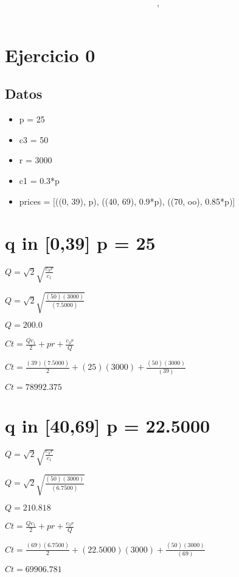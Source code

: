 \documentclass{article}
\author{\nombre , \carnet}
\title{\textbf{\Huge\titulo}}
\newcommand*\rbreak{\par\noindent\linebreak}
\begin{document}
%

\maketitle


\section{\Huge Ejercicio 0}
\subsection{\Huge Datos}
\begin{huge}
\begin{itemize}
\item p = 25
\item c3 = 50
\item r = 3000
\item c1 = 0.3*p
\item prices = [((0, 39), p), ((40, 69), 0.9*p), ((70, oo), 0.85*p)]
\end{itemize}
\end{huge}\section{\Huge \Huge q in [0,39] p = 25}
\begin{huge}
$Q = \sqrt{2} \sqrt{\frac{c_{3} r}{c_{1}}}$\rbreak
$Q = \sqrt{2} \sqrt{\frac{(50)  (3000) }{(7.5000)}}$\rbreak
$Q = 200.0$
\end{huge}
\begin{huge}
$Ct = \frac{Q c_{1}}{2} + p r + \frac{c_{3} r}{Q}$\rbreak
$Ct = \frac{ (39)  (7.5000)}{2} +  (25)   (3000)  + \frac{(50)  (3000) }{ (39) }$\rbreak
$Ct = 78992.375$
\end{huge}
\section{\Huge \Huge q in [40,69] p = 22.5000}
\begin{huge}
$Q = \sqrt{2} \sqrt{\frac{c_{3} r}{c_{1}}}$\rbreak
$Q = \sqrt{2} \sqrt{\frac{(50)  (3000) }{(6.7500)}}$\rbreak
$Q = 210.818$
\end{huge}
\begin{huge}
$Ct = \frac{Q c_{1}}{2} + p r + \frac{c_{3} r}{Q}$\rbreak
$Ct = \frac{ (69)  (6.7500)}{2} +  (22.5000)   (3000)  + \frac{(50)  (3000) }{ (69) }$\rbreak
$Ct = 69906.781$
\end{huge}
\end{document}

